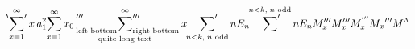 \documentclass{article}
\begin{document}
\[
  \sideset{^\backprime}{'}
  \sum_{x=1}^{\infty} x
  \sideset{a_1^2}{}\sum_{x=1}^\infty x_0
  \\
  \sideset{_\text{left bottom}'''}{_{\text{right bottom}}'''}
  \sum_{\text{quite long text}}^\infty x
  \\
  \sideset{}{'}
  \sum_{n<k,\;\text{$n$ odd}} nE_n
  \\
  \sideset{}{'}
  \sum^{n<k,\;\text{$n$ odd}} nE_n
  \\
  M_x''' M'''_x M^{'''}_x M_x{'''} M^{\prime\backprime}
\]
\end{document}
